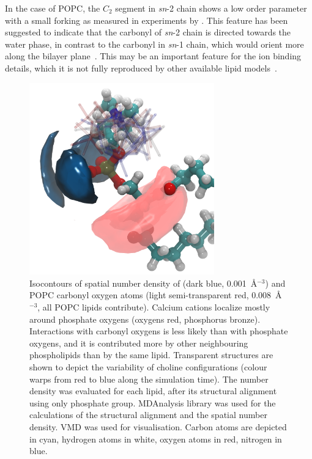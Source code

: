 In the case of POPC, the $C_2$ segment in {\it sn}-2 chain shows a low order parameter with a small forking as measured in experiments by \citet{seelig75,schindler75,gawrisch92}. 
This feature has been suggested to indicate that the carbonyl
of {\it sn}-2 chain is directed towards the water phase, in contrast to the
carbonyl in {\it sn}-1 chain, which would orient more along the bilayer
plane~\cite{seelig75,schindler75,gawrisch92}. This may be an important
feature for the ion binding details, which it is not fully reproduced by other
available lipid models~\cite{ollila16}.

\begin{figure}[tb!] 
  \centering 
  \includegraphics[width=8.0cm]{../img/ecc_popc/isocontours_r37_ca_O-carb.png} 
  \caption{\label{fig:volmaps} 
    Isocontours of spatial number density of  (dark blue, 0.001~Å$^{-3}$) 
    and POPC carbonyl oxygen atoms (light semi-transparent red, 0.008~Å$^{-3}$, all POPC lipids contribute). 
    Calcium cations localize mostly around phosphate oxygens (oxygens red, phosphorus bronze).
    Interactions with carbonyl oxygens is less likely than with phosphate oxygens, 
    and it is contributed more by other neighbouring phospholipids than by the same lipid. 
    Transparent structures are shown to depict the variability of choline configurations 
    (colour warps from red to blue along the simulation time). 
    The number density was evaluated for each lipid, 
    after its structural alignment using only phosphate group.
    MDAnalysis \citep{mdanalysis2011} library was used for 
    the calculations of the structural alignment and the spatial number density. 
    VMD \citep{hump96} was used for visualisation. 
    Carbon atoms are depicted in cyan, hydrogen atoms in white, oxygen atoms in red, nitrogen in blue.
  } 
\end{figure} 
 
